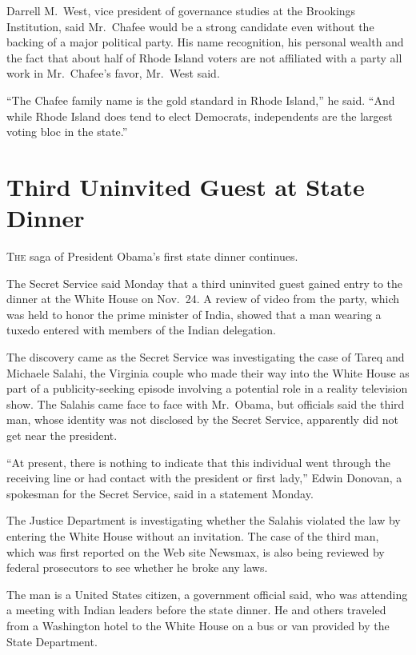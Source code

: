 ﻿\documentclass[12pt]{article}
\begin{document}
Darrell M.~West, vice president of governance studies at the Brookings Institution, said Mr.~Chafee
would be a strong candidate even without the backing of a major political party. His name
recognition, his personal wealth and the fact that about half of Rhode Island voters are not
affiliated with a party all work in Mr.~Chafee's favor, Mr.~West said.

``The Chafee family name is the gold standard in Rhode Island,'' he said. ``And while Rhode Island
does tend to elect Democrats, independents are the largest voting bloc in the state.''

\section{Third Uninvited Guest at State Dinner}

\lettrine{T}{he} saga of President Obama's first state dinner continues.

The Secret Service said Monday that a third uninvited guest gained entry to the dinner at the White
House on Nov.~24. A review of video from the party, which was held to honor the prime minister of
India, showed that a man wearing a tuxedo entered with members of the Indian delegation.

The discovery came as the Secret Service was investigating the case of Tareq and Michaele Salahi,
the Virginia couple who made their way into the White House as part of a publicity-seeking episode
involving a potential role in a reality television show. The Salahis came face to face with
Mr.~Obama, but officials said the third man, whose identity was not disclosed by the Secret Service,
apparently did not get near the president.

``At present, there is nothing to indicate that this individual went through the receiving line or
had contact with the president or first lady,'' Edwin Donovan, a spokesman for the Secret Service,
said in a statement Monday.

The Justice Department is investigating whether the Salahis violated the law by entering the White
House without an invitation. The case of the third man, which was first reported on the Web site
Newsmax, is also being reviewed by federal prosecutors to see whether he broke any laws.

The man is a United States citizen, a government official said, who was attending a meeting with
Indian leaders before the state dinner. He and others traveled from a Washington hotel to the White
House on a bus or van provided by the State Department.
\end{document}
